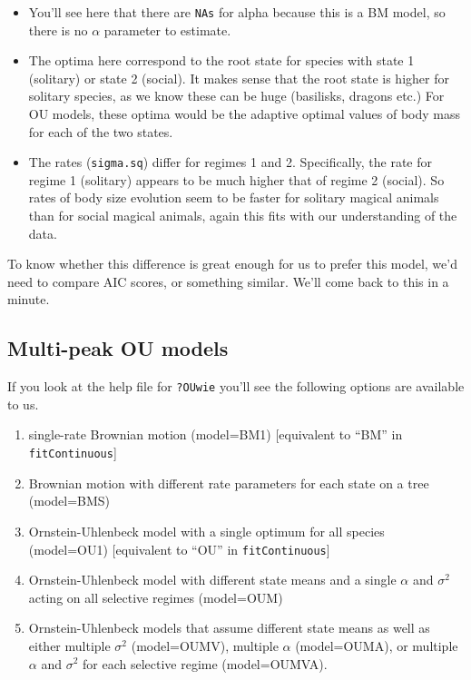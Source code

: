 \documentclass[]{book}
\providecommand{\tightlist}{%
  \setlength{\itemsep}{0pt}\setlength{\parskip}{0pt}}
\theoremstyle{definition}
\theoremstyle{definition}
\theoremstyle{definition}
\theoremstyle{remark}
\begin{document}
\begin{itemize}
\tightlist
\item
  You'll see here that there are \texttt{NAs} for alpha because this is
  a BM model, so there is no \(\alpha\) parameter to estimate.
\item
  The optima here correspond to the root state for species with state 1
  (solitary) or state 2 (social). It makes sense that the root state is
  higher for solitary species, as we know these can be huge (basilisks,
  dragons etc.) For OU models, these optima would be the adaptive
  optimal values of body mass for each of the two states.
\item
  The rates (\texttt{sigma.sq}) differ for regimes 1 and 2.
  Specifically, the rate for regime 1 (solitary) appears to be much
  higher that of regime 2 (social). So rates of body size evolution seem
  to be faster for solitary magical animals than for social magical
  animals, again this fits with our understanding of the data.
\end{itemize}

To know whether this difference is great enough for us to prefer this
model, we'd need to compare AIC scores, or something similar. We'll come
back to this in a minute.

\subsection{Multi-peak OU models}\label{multi-peak-ou-models}

If you look at the help file for \texttt{?OUwie} you'll see the
following options are available to us.

\begin{enumerate}
\def\labelenumi{\arabic{enumi}.}
\tightlist
\item
  single-rate Brownian motion (model=BM1) {[}equivalent to ``BM'' in
  \texttt{fitContinuous}{]}
\item
  Brownian motion with different rate parameters for each state on a
  tree (model=BMS)
\item
  Ornstein-Uhlenbeck model with a single optimum for all species
  (model=OU1) {[}equivalent to ``OU'' in \texttt{fitContinuous}{]}
\item
  Ornstein-Uhlenbeck model with different state means and a single
  \(\alpha\) and \(\sigma^2\) acting on all selective regimes
  (model=OUM)
\item
  Ornstein-Uhlenbeck models that assume different state means as well as
  either multiple \(\sigma^2\) (model=OUMV), multiple \(\alpha\)
  (model=OUMA), or multiple \(\alpha\) and \(\sigma^2\) for each
  selective regime (model=OUMVA).
\end{enumerate}
\end{document}
